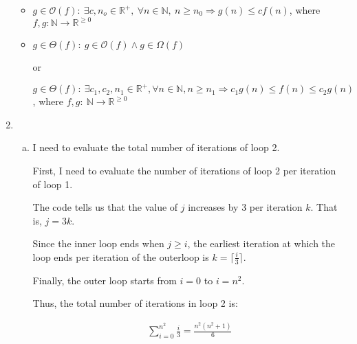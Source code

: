 \documentclass[12pt]{article}
\begin{document}
\begin{enumerate}[1.]
\begin{itemize}
        \item

        $g \in \mathcal{O}(f):\:\exists c,n_o \in \mathbb{R}^{+},\:\forall n \in
        \mathbb{N},\:n \geq n_0 \Rightarrow g(n) \leq cf(n)$, where $f,g:\mathbb{N} \to \mathbb{R}^{\geq 0}$

        \item

        $g \in \Theta(f):\: g \in \mathcal{O}(f) \land g \in \Omega(f)$

        or

        $g \in \Theta(f):\:\exists c_1,c_2,n_1 \in \mathbb{R}^{+}, \forall n \in \mathbb{N}, n \geq n_1
        \Rightarrow c_1g(n) \leq f(n) \leq c_2g(n)$, where $f,g:\:\mathbb{N} \to \mathbb{R}^{\geq 0}$
    \end{itemize}

    \item

    \begin{enumerate}[a)]
        \item

        I need to evaluate the total number of iterations of loop 2.

        \bigskip

        First, I need to evaluate the number of iterations of loop 2 per iteration of loop 1.

        \bigskip

        The code tells us that the value of $j$ increases by 3 per iteration $k$. That is, $j = 3k$.

        \bigskip

        Since the inner loop ends when $j \geq i$, the earliest iteration at which
        the loop ends per iteration of the outerloop is $k = \lceil \frac{i}{3} \rceil$.

        \bigskip

        Finally, the outer loop starts from $i = 0$ to $i = n^2$.

        \bigskip

        Thus, the total number of iterations in loop 2 is:

        \setcounter{equation}{0}
        \begin{align}
            \sum\limits_{i=0}^{n^2} \frac{i}{3} = \frac{n^2 (n^2 + 1)}{6}
        \end{align}

        \bigskip

    \end{enumerate}

\end{enumerate}
\end{document}
